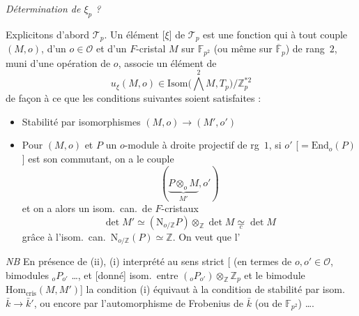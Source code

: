 \documentclass[11pt,a4paper]{article}
\begin{document}
\emph{Détermination de $\xi_{p}$ ?}

Explicitons d'abord $\mathcal{T}_{p}$. Un élément [$\xi$] de
$\mathcal{T}_{p}$ est une fonction qui à tout couple $(M, o)$, d'un
$o \in \mathcal{O}$ et d'un $F$-cristal $M$ sur $\mathbb{F}_{p^{2}}$ (ou
même sur $\overline{\mathbb{F}}_{p}$) de rang~$2$, muni d'une opération de
$o$, associe un  élément de
\[
  u_{\xi}(M, o) \in
  \mathrm{Isom}\bigl(\textstyle\bigwedge^{2} M, T_{p}\bigr) /
  \mathbb{Z}_{p}^{*2}
\]
de façon à ce que les conditions suivantes soient satisfaites :
\begin{itemize}
  \item[(i)] Stabilité par isomorphismes $(M, o) \to (M', o')$
  \item[(ii)] Pour $(M, o)$ et $P$ un $o$-module à droite projectif de
  rg~$1$, si $o'$ [$= \mathrm{End}_{o}(P)$] est son commutant, on a le
  couple
  \[
    (\underbrace{P \otimes_{o} M}_{M'}, o')
  \]
  et on a alors un isom.\ can.\ de $F$-cristaux
  \[
    \det M' \simeq (\mathrm{N}_{o/\mathbb{Z}} P) \otimes_{\mathbb{Z}}
    \det M \underset{c}{\simeq} \det M
  \]
  grâce à l'isom.\ can.\ $\mathrm{N}_{o/\mathbb{Z}}(P) \simeq \mathbb{Z}$.
  On veut que l'\ill{}  \ill{}
\end{itemize}



\emph{NB} En présence de (ii),  (i) interprété au sens strict
[ (en termes de $o, o' \in
\mathcal{O}$, bimodules ${}_{o}P_{o'}$ …, et [donné] isom.\ entre
$({}_{o}P_{o'}) \otimes_{\mathbb{Z}} \mathbb{Z}_{p}$ et le bimodule
$\mathrm{Hom}_{\mathrm{cris}}(M, M')$] la condition (i) équivaut à la
condition de stabilité par isom.\ $\bar{k} \to \bar{k}'$, ou encore par
l'automorphisme de Frobenius de $\bar{k}$ (ou de $\mathbb{F}_{p^{2}}$) ….
\end{document}
